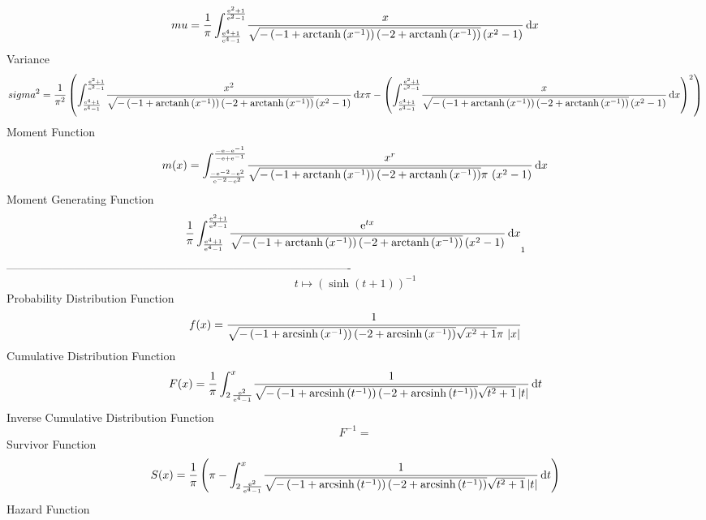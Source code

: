 \documentclass[12pt]{article}
\begin{document}
 $$ mu={\frac {1}{\pi}\int_{{\frac {{{\rm e}^{4}}+1}{{{\rm e}^{4}}-1}}}^{{
\frac {{{\rm e}^{2}}+1}{{{\rm e}^{2}}-1}}}\!{\frac {x}{\sqrt {-
 \left( -1+{\rm arctanh} \left({x}^{-1}\right) \right)  \left( -2+
{\rm arctanh} \left({x}^{-1}\right) \right) } \left( {x}^{2}-1
 \right) }}\,{\rm d}x}
$$ Variance 
 $$ sigma^2 = {\frac {1}{{\pi}^{2}} \left( \int_{{\frac {{{\rm e}^{4}}+1}{{{\rm e}^{
4}}-1}}}^{{\frac {{{\rm e}^{2}}+1}{{{\rm e}^{2}}-1}}}\!{\frac {{x}^{2}
}{\sqrt {- \left( -1+{\rm arctanh} \left({x}^{-1}\right) \right) 
 \left( -2+{\rm arctanh} \left({x}^{-1}\right) \right) } \left( {x}^{2
}-1 \right) }}\,{\rm d}x\pi- \left( \int_{{\frac {{{\rm e}^{4}}+1}{{
{\rm e}^{4}}-1}}}^{{\frac {{{\rm e}^{2}}+1}{{{\rm e}^{2}}-1}}}\!{
\frac {x}{\sqrt {- \left( -1+{\rm arctanh} \left({x}^{-1}\right)
 \right)  \left( -2+{\rm arctanh} \left({x}^{-1}\right) \right) }
 \left( {x}^{2}-1 \right) }}\,{\rm d}x \right) ^{2} \right) }
$$ Moment Function 
 $$ m(x) = \int_{{\frac {-{{\rm e}^{-2}}-{{\rm e}^{2}}}{{{\rm e}^{-2}}-{{\rm e}^{
2}}}}}^{{\frac {-{\rm e}-{{\rm e}^{-1}}}{-{\rm e}+{{\rm e}^{-1}}}}}\!{
\frac {{x}^{r}}{\sqrt {- \left( -1+{\rm arctanh} \left({x}^{-1}\right)
 \right)  \left( -2+{\rm arctanh} \left({x}^{-1}\right) \right) }\pi\,
 \left( {x}^{2}-1 \right) }}\,{\rm d}x
$$ Moment Generating Function 
 $${\frac {1}{\pi}\int_{{\frac {{{\rm e}^{4}}+1}{{{\rm e}^{4}}-1}}}^{{
\frac {{{\rm e}^{2}}+1}{{{\rm e}^{2}}-1}}}\!{\frac {{{\rm e}^{tx}}}{
\sqrt {- \left( -1+{\rm arctanh} \left({x}^{-1}\right) \right) 
 \left( -2+{\rm arctanh} \left({x}^{-1}\right) \right) } \left( {x}^{2
}-1 \right) }}\,{\rm d}x}_{{1}}
$$-------------------------------------------------------------------------------------------  \\$$t\mapsto  \left( \sinh \left( t+1 \right)  \right) ^{-1}
$$Probability Distribution Function 
$$  f(x)={\frac {1}{\sqrt {- \left( -1+{\rm arcsinh} \left({x}^{-1}\right)
 \right)  \left( -2+{\rm arcsinh} \left({x}^{-1}\right) \right) }
\sqrt {{x}^{2}+1}\pi\, \left| x \right| }}
$$Cumulative Distribution Function  
 $$F(x)={\frac {1}{\pi}\int_{2\,{\frac {{{\rm e}^{2}}}{{{\rm e}^{4}}-1}}}^{x}
\!{\frac {1}{\sqrt {- \left( -1+{\rm arcsinh} \left({t}^{-1}\right)
 \right)  \left( -2+{\rm arcsinh} \left({t}^{-1}\right) \right) }
\sqrt {{t}^{2}+1} \left| t \right| }}\,{\rm d}t}
$$ Inverse Cumulative Distribution Function 
  $$F^{-1} = $$Survivor Function 
 $$ S(x)={\frac {1}{\pi} \left( \pi-\int_{2\,{\frac {{{\rm e}^{2}}}{{{\rm e}^{4
}}-1}}}^{x}\!{\frac {1}{\sqrt {- \left( -1+{\rm arcsinh} \left({t}^{-1
}\right) \right)  \left( -2+{\rm arcsinh} \left({t}^{-1}\right)
 \right) }\sqrt {{t}^{2}+1} \left| t \right| }}\,{\rm d}t \right) }
$$ Hazard Function 
\end{document}
